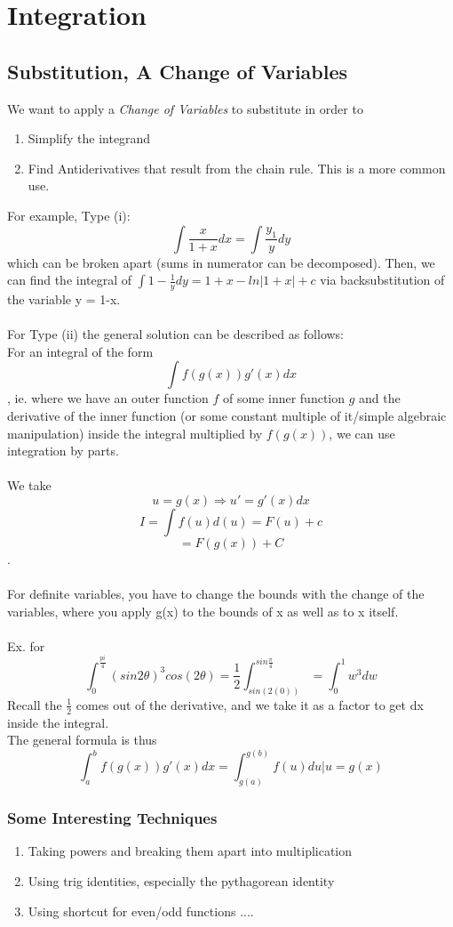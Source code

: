 \documentclass[twocolumn, 12pt]{report}
\begin{document}
  \chapter{Integration}
  \section {Substitution, A Change of Variables}
  We want to apply a \textit {Change of Variables} to substitute in order to \begin{enumerate}
    \item Simplify the integrand
    \item Find Antiderivatives that result from the chain rule. This is a more common use.
  \end{enumerate}
  For example, Type (i): $$\int \frac{x}{1+x} dx = \int \frac{y_1}{y} dy$$ which can be broken apart (sums in numerator can be decomposed). Then, we can find the integral of $\int 1- \frac{1}{y}dy = 1+ x - ln|1+x| + c$ via backsubstitution of the variable y = 1-x. \\\\
  For Type (ii) the general solution can be described as follows: \\ For an integral of the form $$\int f(g(x))g'(x) dx$$, ie. where we have an outer function $f$ of some inner function $g$ and the derivative of the inner function (or some constant multiple of it/simple algebraic manipulation) inside the integral multiplied by $f(g(x))$, we can use integration by parts. \\\\ We take $$u = g(x) \Rightarrow u' = g'(x) dx$$ $$I = \int f(u) d(u) = F(u) + c$$ $$=F(g(x)) + C$$.  \\\\
  For definite variables, you have to change the bounds with the change of the variables, where you apply g(x) to the bounds of x as well as to x itself. \\\\
  Ex. for $$\int_0^\frac{pi}{4} (sin 2\theta)^3 cos(2\theta) = \frac{1}{2}\int_{sin(2(0))}^{sin\frac{\pi}{4}} = \int^1_0 w^3 dw$$ Recall the $\frac{1}{2}$ comes out of the derivative, and we take it as a factor to get dx inside the integral. \\ The general formula is thus $$\int_a^b f(g(x))g'(x) dx = \int_{g(a)}^{g(b)} f(u)du | u = g(x)$$
  \subsection{Some Interesting Techniques}
  \begin{enumerate}
    \item Taking powers and breaking them apart into multiplication
    \item Using trig identities, especially the pythagorean identity
    \item Using shortcut for even/odd functions ....
  \end{enumerate}
\end{document}

